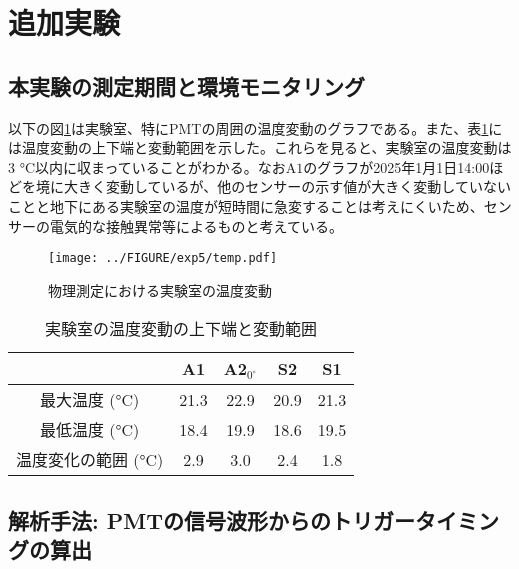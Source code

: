 \documentclass[../../main.tex]{subfiles}
\numberwithin{equation}{section}
\numberwithin{table}{section}
\numberwithin{figure}{section}
\begin{document}
\FloatBarrier
\section{追加実験}

\subsection{本実験の測定期間と環境モニタリング}\label{sec:exp5_run_period}

				以下の図\ref{fig:temp}は実験室、特にPMTの周囲の温度変動のグラフである。また、表\ref{table:temp}には温度変動の上下端と変動範囲を示した。これらを見ると、実験室の温度変動は3 \si{\degreeCelsius}以内に収まっていることがわかる。なお$\mathrm{A1}$のグラフが2025年1月1日14:00ほどを境に大きく変動しているが、他のセンサーの示す値が大きく変動していないことと地下にある実験室の温度が短時間に急変することは考えにくいため、センサーの電気的な接触異常等によるものと考えている。


				\begin{figure}[b]
					\centering
					\texttt{[image: ../FIGURE/exp5/temp.pdf]}
					\caption{物理測定における実験室の温度変動}
					\label{fig:temp}
				\end{figure}


				\begin{table}[b]
					\centering
					\caption{実験室の温度変動の上下端と変動範囲}\label{table:temp}
					\begin{tabular}{c|cccc}
						& A1 & A2$_{0^{\circ}}$ & S2 & S1 \\ \hline
						最大温度 (\si{\degreeCelsius}) & 21.3 & 22.9 & 20.9 & 21.3 \\
						最低温度 (\si{\degreeCelsius}) & 18.4 & 19.9 & 18.6 & 19.5 \\
						温度変化の範囲 (\si{\degreeCelsius}) & 2.9 & 3.0 & 2.4 & 1.8 \\
					\end{tabular}
				\end{table}

  \FloatBarrier
  \subsection{解析手法: PMTの信号波形からのトリガータイミングの算出}\label{sec:PMT_discriCell}
\end{document}
